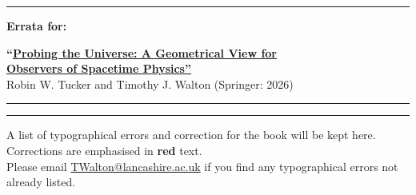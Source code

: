 \documentclass[12pt]{GeomPhysBOOK}
\newcommand\correct[1]{{\color{red!80!black}\bf #1}}
\begin{document}

\rule{0.999\textwidth}{0.05cm}\vspace{0.2cm}
\begin{center}
	\begin{minipage}{0.18\textwidth}
		{\bf \large Errata for:} 		
	\end{minipage}\;
	\begin{minipage}[t]{0.8\textwidth}
		\centering
		{\Large\bf ``\href{https://doi.org/10.1007/978-3-031-96452-7}{Probing the Universe: A Geometrical View for}} \\[0.2cm] {\Large\bf \href{https://doi.org/10.1007/978-3-031-96452-7}{Observers of Spacetime Physics''}} \\[0.4cm]
		{\large Robin W. Tucker and Timothy J. Walton (Springer: 2026)}
	\end{minipage}
\end{center}
\rule{0.47\textwidth}{0.05cm}\parbox{1cm}{\vspace{0.1cm}\centering\normalsize \OrnamentDiamondSolid}\rule{0.47\textwidth}{0.05cm}\vspace{0.7cm}

A list of typographical errors and correction for the book will be kept here. Corrections are emphasised in \correct{red} text. \\[0.3cm]
Please email \href{mailto:TWalton@lancashire.ac.uk}{TWalton@lancashire.ac.uk} if you find any typographical errors not already listed.\\[0.1cm]
\end{document}

